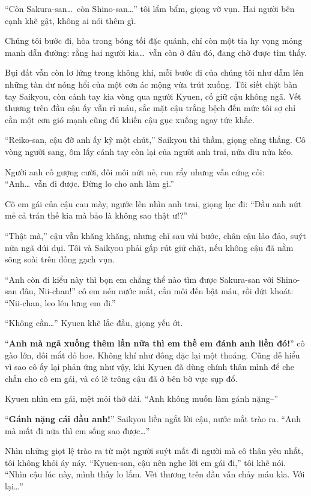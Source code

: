 \documentclass[../main.tex]{subfiles}
\begin{document}
``Còn Sakura-san\dots\ còn Shino-san\dots'' tôi lẩm bẩm, giọng vỡ vụn. Hai người bên cạnh khẽ gật, không ai nói thêm gì.

Chúng tôi bước đi, hòa trong bóng tối đặc quánh, chỉ còn một tia hy vọng mỏng manh dẫn đường: rằng hai người kia\dots\ vẫn còn ở đâu đó, đang chờ được tìm thấy.

\ct

Bụi đất vẫn còn lơ lửng trong không khí, mỗi bước đi của chúng tôi như dẫm lên những tàn dư nóng hổi của một cơn ác mộng vừa trút xuống. Tôi siết chặt bàn tay Saikyou, còn cánh tay kia vòng qua người Kyuen, cố giữ cậu không ngã. Vết thương trên đầu cậu ấy vẫn rỉ máu, sắc mặt cậu trắng bệch đến mức tôi sợ chỉ cần một cơn gió mạnh cũng đủ khiến cậu gục xuống ngay tức khắc.

``Reiko-san, cậu đỡ anh ấy kỹ một chút,'' Saikyou thì thầm, giọng căng thẳng. Cô vòng người sang, ôm lấy cánh tay còn lại của người anh trai, nửa dìu nửa kéo.

Người anh cố gượng cười, đôi môi nứt nẻ, run rẩy nhưng vẫn cứng cỏi: ``Anh\dots\ vẫn đi được. Đừng lo cho anh làm gì.''

Cô em gái của cậu cau mày, ngước lên nhìn anh trai, giọng lạc đi: ``Đầu anh nứt mẻ cả trán thế kia mà bảo là không sao thật ư!?''

``Thật mà,'' cậu vẫn khăng khăng, nhưng chỉ sau vài bước, chân cậu lảo đảo, suýt nữa ngã dúi dụi. Tôi và Saikyou phải gấp rút giữ chặt, nếu không cậu đã nằm sõng soài trên đống gạch vụn.

``Anh còn đi kiểu này thì bọn em chẳng thể nào tìm được Sakura-san với Shino-san đâu, Nii-chan!'' cô em nén nước mắt, cắn môi đến bật máu, rồi dứt khoát: ``Nii-chan, leo lên lưng em đi.''

``Không cần\dots'' Kyuen khẽ lắc đầu, giọng yếu ớt.

``\textbf{Anh mà ngã xuống thêm lần nữa thì em thề em đánh anh liền đó!}'' cô gào lớn, đôi mắt đỏ hoe. Không khí như đông đặc lại một thoáng. Cũng dễ hiểu vì sao cô ấy lại phản ứng như vậy, khi Kyuen đã dùng chính thân mình để che chắn cho cô em gái, và có lẽ trông cậu đã ở bên bờ vực sụp đổ.

Kyuen nhìn em gái, mệt mỏi thở dài. ``Anh không muốn làm gánh nặng--''

``\textbf{Gánh nặng cái đầu anh!}'' Saikyou liền ngắt lời cậu, nước mắt trào ra. ``Anh mà mất đi nữa thì em sống sao được\dots''

Nhìn những giọt lệ trào ra từ một người suýt mất đi người mà cô thân yêu nhất, tôi không khỏi áy náy. ``Kyuen-san, cậu nên nghe lời em gái đi,'' tôi khẽ nói. ``Nhìn cậu lúc này, mình thấy lo lắm. Vết thương trên đầu vẫn chảy máu kìa. Với lại\dots''
\end{document}
